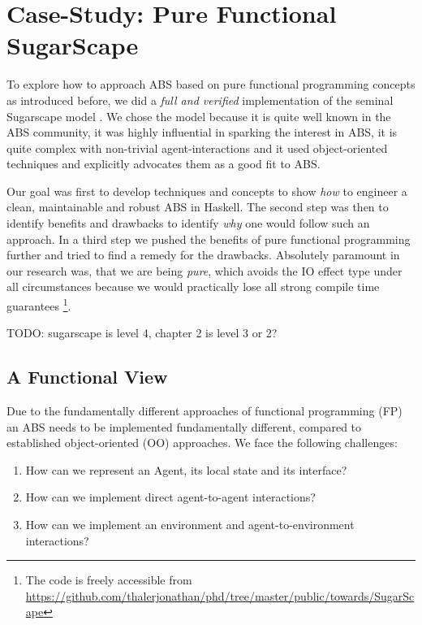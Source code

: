\section{Case-Study: Pure Functional SugarScape}
\label{sec:case_study}

To explore how to approach ABS based on pure functional programming concepts as introduced before, we did a \textit{full and verified} implementation of the seminal Sugarscape model \cite{epstein_growing_1996}. We chose the model because it is quite well known in the ABS community, it was highly influential in sparking the interest in ABS, it is quite complex with non-trivial agent-interactions and it used object-oriented techniques and explicitly advocates them as a good fit to ABS. 

Our goal was first to develop techniques and concepts to show \textit{how} to engineer a clean, maintainable and robust ABS in Haskell. The second step was then to identify benefits and drawbacks to identify \textit{why} one would follow such an approach. In a third step we pushed the benefits of pure functional programming further and tried to find a remedy for the drawbacks. Absolutely paramount in our research was, that we are being \textit{pure}, which avoids the IO effect type under all circumstances because we would practically lose all strong compile time guarantees \footnote{The code is freely accessible from \url{https://github.com/thalerjonathan/phd/tree/master/public/towards/SugarScape}}.

TODO: \cite{macal_everything_2016} sugarscape is level 4, chapter 2 is level 3 or 2?


\subsection{A Functional View}
Due to the fundamentally different approaches of functional programming (FP) an ABS needs to be implemented fundamentally different, compared to established object-oriented (OO) approaches. We face the following challenges:

\begin{enumerate}
	\item How can we represent an Agent, its local state and its interface?
	\item How can we implement direct agent-to-agent interactions?
	\item How can we implement an environment and agent-to-environment interactions? 
\end{enumerate}

